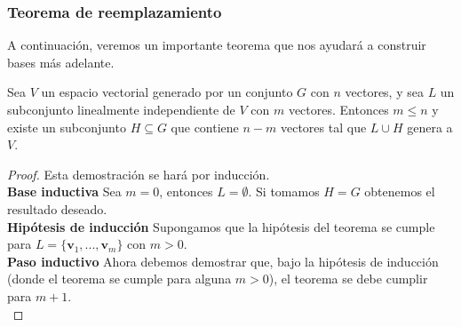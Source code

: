 \documentclass[notasLineal]{subfiles}
\begin{document}
\subsubsection*{Teorema de reemplazamiento} \label{Subsubsec:Teo_de_reemplazamiento}

A continuación, veremos un importante teorema que nos ayudará a construir bases más adelante.

\begin{Teo}
    Sea $V$ un espacio vectorial generado por un conjunto $G$ con $n$ vectores, y sea $L$ un subconjunto linealmente independiente de $V$ con $m$ vectores. Entonces $m\le n$ y existe un subconjunto $H\subseteq G$ que contiene $n-m$ vectores tal que $L\cup H$ genera a $V$.

    \begin{proof}
        Esta demostración se hará por inducción. \\

    \textbf{Base inductiva}
    Sea $m=0$, entonces $L=\emptyset$. Si tomamos $H=G$ obtenemos el resultado deseado. \\

    \textbf{Hipótesis de inducción}
    Supongamos que la hipótesis del teorema se cumple para $L=\{\mathbf{v}_1,...,\mathbf{v}_m\}$ con $m>0$. \\

    \textbf{Paso inductivo}
    Ahora debemos demostrar que, bajo la hipótesis de inducción (donde el teorema se cumple para alguna $m>0$), el teorema se debe cumplir para $m+1$. \\
    

\end{proof}
\end{Teo}
\end{document}

